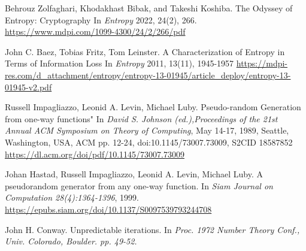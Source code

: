 \documentclass[preprint]{sigplanconf}
\begin{document}
\begin{thebibliography}{9}
    Behrouz Zolfaghari, Khodakhast Bibak, and Takeshi Koshiba.
    \newblock The Odyssey of Entropy: Cryptography
    \newblock In \emph{Entropy} 2022, 24(2), 266.
    \newline \url{https://www.mdpi.com/1099-4300/24/2/266/pdf}

    John C. Baez, Tobias Fritz, Tom Leinster.
    \newblock A Characterization of Entropy in Terms of Information Loss
    \newblock In \emph{Entropy} 2011, 13(11), 1945-1957
    \newline \url{https://mdpi-res.com/d_attachment/entropy/entropy-13-01945/article_deploy/entropy-13-01945-v2.pdf}

    Russell Impagliazzo, Leonid A. Levin, Michael Luby.
    \newblock Pseudo-random Generation from one-way functions"
    \newblock In \emph{David S. Johnson (ed.),Proceedings of the 21st Annual ACM Symposium on Theory of Computing}, May 14-17, 1989, Seattle, Washington, USA, {ACM} pp. 12-24,
    \newline doi:10.1145/73007.73009, S2CID 18587852
    \newline \url{https://dl.acm.org/doi/pdf/10.1145/73007.73009}

    Johan Hastad, Russell Impagliazzo, Leonid A. Levin, Michael Luby.
    \newblock A pseudorandom generator from any one-way function. 
    \newblock In \emph{Siam Journal on Computation 28(4):1364-1396}, 1999.
    \newline \url{https://epubs.siam.org/doi/10.1137/S0097539793244708}

    John H. Conway.
    \newblock Unpredictable iterations.  
    \newblock In \emph{Proc. 1972 Number Theory Conf., Univ. Colorado, Boulder. pp. 49-52.}

\end{thebibliography}
\end{document}
